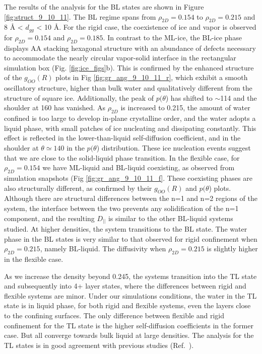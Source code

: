 \documentclass[journal=acsnano,manuscript=article]{achemso}
\begin{document}
The results of the analysis for the BL states are shown in Figure \ref{fig:struct_9_10_11}. The BL regime spans from \(\rho_{2D}=0.154\) to \(\rho_{2D}=0.215\) and 8 \r A < \(d_{gg}\) < 10 \r A. For the rigid case, the coexistence of ice and vapor is observed for \(\rho_{2D}=0.154\) and \(\rho_{2D}=0.185\). In contrast to the ML-ice, the BL-ice phase displays AA stacking hexagonal structure with an abundance of defects necessary to accommodate the nearly circular vapor-solid interface in the rectangular simulation box (Fig. \ref{fig:ice_figs}b). This is confirmed by the enhanced structure of the \(g_{OO}(R)\) plots in Fig \ref{fig:gr_ang_9_10_11_r}, which exhibit a smooth oscillatory structure, higher than bulk water and qualitatively different from the structure of square ice. Additionally, the peak of \(p(\theta\)) has shifted to \(\sim\)114 and the shoulder at 160 has vanished. As \(\rho_{2D}\) is increased to 0.215, the amount of water confined is too large to develop in-plane crystalline order, and the water adopts a liquid phase, with small patches of ice nucleating and dissipating constantly. This effect is reflected in the lower-than-liquid self-diffusion coefficient, and in the shoulder at \(\theta\simeq140\) in the \(p(\theta\)) distribution. These ice nucleation events suggest that we are close to the solid-liquid phase transition. In the flexible case, for \(\rho_{2D}=0.154\) we have ML-liquid and BL-liquid coexisting, as observed from simulation snapshots (Fig \ref{fig:gr_ang_9_10_11_f}. These coexisting phases are also structurally different, as confirmed by their \(g_{OO}(R)\) and \(p(\theta\)) plots. Although there are structural differences between the n=1 and n=2 regions of the system, the interface between the two prevents any solidification of the n=1 component, and the resulting \(D_{||}\) is similar to the other BL-liquid systems studied. At higher densities, the system transitions to the BL state. The water phase in the BL states is very similar to that observed for rigid confinement when \(\rho_{2D}=0.215\), namely BL-liquid. The diffusivity when \(\rho_{2D}=0.215\) is slightly higher in the flexible case.

As we increase the density beyond 0.245, the systems transition into the TL state and subsequently into 4+ layer states, where the differences between rigid and flexible systems are minor. Under our simulations conditions, the water in the TL state is in liquid phase, for both rigid and flexible systems, even the layers close to the confining surfaces. The only difference between flexible and rigid confinement for the TL state is the higher self-diffusion coefficients in the former case. But all converge towards bulk liquid at large densities. The analysis for the TL states is in good agreement with previous studies (Ref.~).
\end{document}
